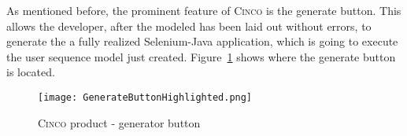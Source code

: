 As mentioned before, the prominent feature of \textsc{Cinco} is the generate button. This allows the developer, after the modeled has been laid out without errors, to generate the a fully realized Selenium-Java application, which is going to execute the user sequence model just created. Figure~\ref{fig:genButton} shows where the generate button is located.

\begin{figure}[H]
    \centering
    \texttt{[image: GenerateButtonHighlighted.png]}
    \caption{\textsc{Cinco} product - generator button}
    \label{fig:genButton}
\end{figure}
